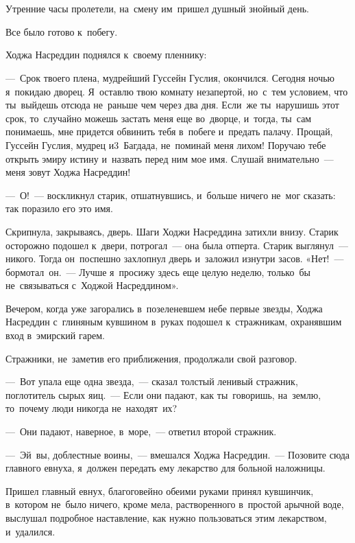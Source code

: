 \documentclass[12pt,a4paper]{book}
\begin{document}
\chapter{}

Утренние часы пролетели, на~смену им~пришел душный знойный день.

Все было готово к~побегу.

Ходжа Насреддин поднялся к~своему пленнику:

—~Срок твоего плена, мудрейший Гуссейн Гуслия, окончился. Сегодня ночью я~покидаю дворец. Я~оставлю твою комнату незапертой, но~с~тем условием, что ты~выйдешь отсюда не~раньше чем через два дня. Если~же ты~нарушишь этот срок, то~случайно можешь застать меня еще во~дворце, и~тогда, ты~сам понимаешь, мне придется обвинить тебя в~побеге и~предать палачу. Прощай, Гуссейн Гуслия, мудрец и3~Багдада, не~поминай меня лихом! Поручаю тебе открыть эмиру истину и~назвать перед ним мое имя. Слушай внимательно~— меня зовут Ходжа Насреддин!

—~О!~— воскликнул старик, отшатнувшись, и~больше ничего не~мог сказать: так поразило его это имя.

Скрипнула, закрываясь, дверь. Шаги Ходжи Насреддина затихли внизу. Старик осторожно подошел к~двери, потрогал~— она была отперта. Старик выглянул~— никого. Тогда он~поспешно захлопнул дверь и~заложил изнутри засов. «Нет!~— бормотал~он.~— Лучше я~просижу здесь еще целую неделю, только~бы не~связываться с~Ходжой Насреддином».

Вечером, когда уже загорались в~позеленевшем небе первые звезды, Ходжа Насреддин с~глиняным кувшином в~руках подошел к~стражникам, охранявшим вход в~эмирский гарем.

Стражники, не~заметив его приближения, продолжали свой разговор.

—~Вот упала еще одна звезда,~— сказал толстый ленивый стражник, поглотитель сырых яиц.~— Если они падают, как ты~говоришь, на~землю, то~почему люди никогда не~находят~их?

—~Они падают, наверное, в~море,~— ответил второй стражник.

—~Эй~вы, доблестные воины,~— вмешался Ходжа Насреддин.~— Позовите сюда главного евнуха, я~должен передать ему лекарство для больной наложницы.

Пришел главный евнух, благоговейно обеими руками принял кувшинчик, в~котором не~было ничего, кроме мела, растворенного в~простой арычной воде, выслушал подробное наставление, как нужно пользоваться этим лекарством, и~удалился.
\end{document}
